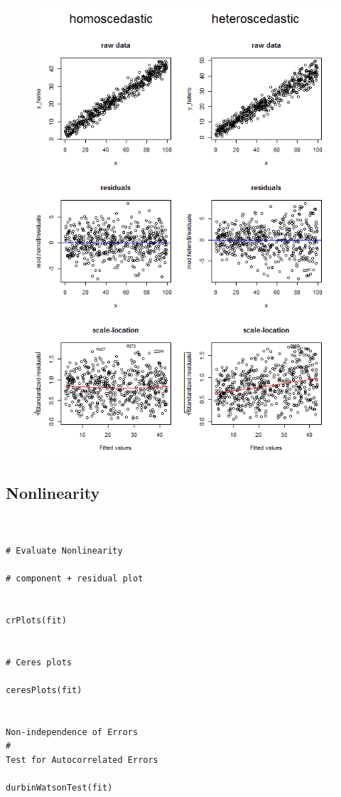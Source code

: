 \documentclass[residuals.tex]{subfiles}
\begin{document}
\newpage
\begin{figure}[h!]
\centering
\includegraphics[width=0.7\linewidth]{homosked2.png}
\caption{}
\label{fig:homosked2}
\end{figure}
\newpage


\subsection{Nonlinearity}

\begin{framed}

\begin{verbatim}	
	

# Evaluate Nonlinearity

# component + residual plot 


crPlots(fit)


# Ceres plots 

ceresPlots(fit)


Non-independence of Errors
# 
Test for Autocorrelated Errors

durbinWatsonTest(fit)

\end{verbatim}

\end{framed}
\end{document}
